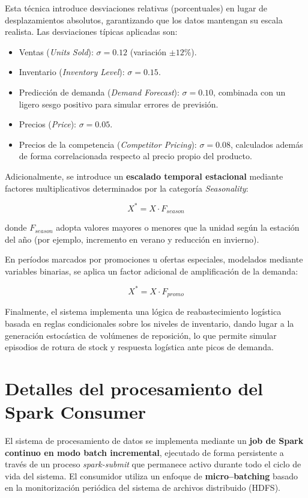 \documentclass[12pt,a4paper]{article}
\begin{document}
	Esta técnica introduce desviaciones relativas (porcentuales) en lugar de desplazamientos absolutos, garantizando que los datos mantengan su escala realista. Las desviaciones típicas aplicadas son:
	
	\begin{itemize}
		\item Ventas (\textit{Units Sold}): $\sigma = 0.12$ (variación $\pm 12\%$).
		\item Inventario (\textit{Inventory Level}): $\sigma = 0.15$.
		\item Predicción de demanda (\textit{Demand Forecast}): $\sigma = 0.10$, combinada con un ligero sesgo positivo para simular errores de previsión.
		\item Precios (\textit{Price}): $\sigma = 0.05$.
		\item Precios de la competencia (\textit{Competitor Pricing}): $\sigma = 0.08$, calculados además de forma correlacionada respecto al precio propio del producto.
	\end{itemize}
	
	Adicionalmente, se introduce un \textbf{escalado temporal estacional} mediante factores multiplicativos determinados por la categoría \textit{Seasonality}:
	
	\[
	X^\ast = X \cdot F_{season}
	\]
	
	donde $F_{season}$ adopta valores mayores o menores que la unidad según la estación del año (por ejemplo, incremento en verano y reducción en invierno).
	
	En períodos marcados por promociones u ofertas especiales, modelados mediante variables binarias, se aplica un factor adicional de amplificación de la demanda:
	
	\[
	X^\ast = X \cdot F_{promo}
	\]
	
	Finalmente, el sistema implementa una lógica de reabastecimiento logística basada en reglas condicionales sobre los niveles de inventario, dando lugar a la generación estocástica de volúmenes de reposición, lo que permite simular episodios de rotura de stock y respuesta logística ante picos de demanda.
		
	\section{Detalles del procesamiento del Spark Consumer}
	
	El sistema de procesamiento de datos se implementa mediante un \textbf{job de Spark continuo en modo batch incremental}, ejecutado de forma persistente a través de un proceso \textit{spark-submit} que permanece activo durante todo el ciclo de vida del sistema. El consumidor utiliza un enfoque de \textbf{micro–batching} basado en la monitorización periódica del sistema de archivos distribuido (HDFS).
	
\end{document}
